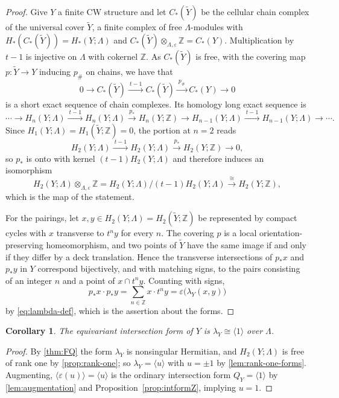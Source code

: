 \documentclass[11pt]{amsart}
\newtheorem{corollary}[theorem]{Corollary}
\theoremstyle{definition}
\theoremstyle{remark}
\newcommand{\Z}{\mathbb Z}
\begin{document}
\begin{proof}
  Give $Y$ a finite CW structure and let $C_*(\widetilde Y)$ be the
  cellular chain complex of the universal cover ${\widetilde {Y}}$, a
  finite complex of free $\Lambda$-modules with $H_*(C_*(\widetilde
  Y))=H_*(Y;\Lambda)$ and $C_*(\widetilde
  Y)\otimes_{\Lambda,\varepsilon}\Z=C_*(Y)$.  Multiplication by $t-1$
  is injective on $\Lambda$ with cokernel $\Z$. As $C_*(\widetilde Y)$
  is free, with the covering map $p\colon {\widetilde {Y}}\to Y$
  inducing $p_{\#}$ on chains, we have that
\[
 0\longrightarrow C_*(\widetilde Y)\xrightarrow{\ t-1\ }C_* (\widetilde Y)
 \xrightarrow{\ p_\#\ }C_*(Y)\longrightarrow0
\]
is a short exact sequence of chain complexes.  Its homology long exact
sequence is
\[
 \cdots\to H_n(Y;\Lambda)\xrightarrow{\ t-1\ }H_n(Y;\Lambda)
 \xrightarrow{\ p_*\ }H_n(Y;\Z)\to H_{n-1}(Y;\Lambda)
 \xrightarrow{\ t-1\ }H_{n-1}(Y;\Lambda)\to\cdots .
\]
Since $H_1(Y;\Lambda)=H_1(\widetilde Y;\Z)=0$, the portion at $n=2$ reads
\[
 H_2(Y;\Lambda)\xrightarrow{\ t-1\ }H_2(Y;\Lambda)
 \xrightarrow{\ p_*\ }H_2(Y;\Z)\longrightarrow0 ,
\]
so $p_*$ is onto with kernel $(t-1)H_2(Y;\Lambda)$ and therefore induces an
isomorphism
\[
 H_2(Y;\Lambda)\otimes_{\Lambda,\varepsilon}\Z
 =H_2(Y;\Lambda)/(t-1)H_2(Y;\Lambda)
 \xrightarrow{\ \cong\ }H_2(Y;\Z),
\]
which is the map of the statement.

For the pairings, let $x,y\in H_2(Y;\Lambda)=H_2(\widetilde Y;\Z)$ be
represented by compact cycles with $x$ transverse to $t^ny$ for every $n$.
The covering $p$ is a local orientation-preserving homeomorphism, and two
points of $\widetilde Y$ have the same image if and only if they differ by a
deck translation.  Hence the transverse intersections of $p_*x$ and $p_*y$
in $Y$ correspond bijectively, and with matching signs, to the pairs
consisting of an integer $n$ and a point of $x\cap t^ny$.  Counting with
signs,
\[
 p_*x\cdot p_*y=\sum_{n\in\Z}x\cdot t^ny
 =\varepsilon\bigl(\lambda_Y(x,y)\bigr)
\]
by \eqref{eq:lambda-def}, which is the assertion about the forms.
\end{proof}

\begin{corollary}\label{cor:lambda-Y}
The equivariant intersection form of $Y$ is $\lambda_Y\cong \langle 1\rangle $ over
$\Lambda$.
\end{corollary}

\begin{proof}
By \cref{thm:FQ} the form $\lambda_Y$ is nonsingular Hermitian, and
$H_2(Y;\Lambda)$ is free of rank one by \cref{prop:rank-one}; so
$\lambda_Y=\langle u\rangle$ with $u=\pm1$ by
\cref{lem:rank-one-forms}.  Augmenting,
$\langle\varepsilon(u)\rangle=\langle u\rangle$ is the ordinary
intersection form $Q_Y=\langle 1\rangle $ by
\cref{lem:augmentation} and Proposition~\ref{prop:intformZ},
implying $u=1$.
\end{proof}
\end{document}
